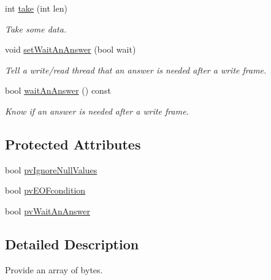 \begin{DoxyCompactItemize}
int \hyperlink{classmdt_frame_ad8b184e6eb07a26fe84deaf233c1aa9b}{take} (int len)
\begin{DoxyCompactList}\small\item\em Take some data. \end{DoxyCompactList}\item 
void \hyperlink{classmdt_frame_a3b9a331858df9061879592fab1b346f5}{set\-Wait\-An\-Answer} (bool wait)
\begin{DoxyCompactList}\small\item\em Tell a write/read thread that an answer is needed after a write frame. \end{DoxyCompactList}\item 
bool \hyperlink{classmdt_frame_ab27455f2fa3415a96482786c0ec27e55}{wait\-An\-Answer} () const 
\begin{DoxyCompactList}\small\item\em Know if an answer is needed after a write frame. \end{DoxyCompactList}\end{DoxyCompactItemize}
\subsection*{Protected Attributes}
\begin{DoxyCompactItemize}
\item 
bool \hyperlink{classmdt_frame_a883c4de8f2c961310366d5a72b6e6dd8}{pv\-Ignore\-Null\-Values}
\item 
bool \hyperlink{classmdt_frame_a1862e197bad6e9887cfedc54a768e88d}{pv\-E\-O\-Fcondition}
\item 
bool \hyperlink{classmdt_frame_aac030954a872c41f7fb917912e16a77f}{pv\-Wait\-An\-Answer}
\end{DoxyCompactItemize}


\subsection{Detailed Description}
Provide an array of bytes. 

